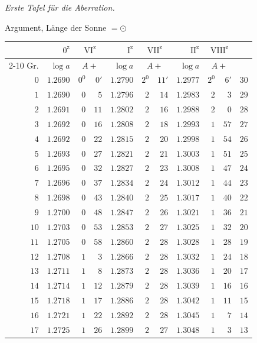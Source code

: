 \begin{center}
\textit{Erste Tafel für die Aberration.}\par\medskip
Argument, Länge der Sonne $=\odot$\par\medskip
\begingroup\small\setlength{\tabcolsep}{5pt}
\begin{tabular}{r||r|rr||r|rr||r|rr||r}
&$0^{\mathrm z}$&\multicolumn{2}{c||}{$\mathrm{VI}^{\mathrm z}$}&$\mathrm I^{\mathrm z}$&\multicolumn{2}{c||}{$\mathrm{VII}^{\mathrm z}$}&$\mathrm{II}^{\mathrm z}$&\multicolumn{2}{c||}{$\mathrm{VIII}^{\mathrm z}$}&\\\cline{2-10}
Gr.&$\log a$&\multicolumn{2}{c||}{$A+$}&$\log a$&\multicolumn{2}{c||}{$A+$}&$\log a$&\multicolumn{2}{c||}{$A+$}&\\\hline
$0$&$1.2690$&$0^0$&$0'$&$1.2790$&$2^0$&$11'$&$1.2977$&$2^0$&$6'$&$30$\\
$1$&$1.2690$&$0$&$5$&$1.2796$&$2$&$14$&$1.2983$&$2$&$3$&$29$\\
$2$&$1.2691$&$0$&$11$&$1.2802$&$2$&$16$&$1.2988$&$2$&$0$&$28$\\
$3$&$1.2692$&$0$&$16$&$1.2808$&$2$&$18$&$1.2993$&$1$&$57$&$27$\\
$4$&$1.2692$&$0$&$22$&$1.2815$&$2$&$20$&$1.2998$&$1$&$54$&$26$\\
$5$&$1.2693$&$0$&$27$&$1.2821$&$2$&$21$&$1.3003$&$1$&$51$&$25$\\[3pt]
$6$&$1.2695$&$0$&$32$&$1.2827$&$2$&$23$&$1.3008$&$1$&$47$&$24$\\
$7$&$1.2696$&$0$&$37$&$1.2834$&$2$&$24$&$1.3012$&$1$&$44$&$23$\\
$8$&$1.2698$&$0$&$43$&$1.2840$&$2$&$25$&$1.3017$&$1$&$40$&$22$\\
$9$&$1.2700$&$0$&$48$&$1.2847$&$2$&$26$&$1.3021$&$1$&$36$&$21$\\
$10$&$1.2703$&$0$&$53$&$1.2853$&$2$&$27$&$1.3025$&$1$&$32$&$20$\\[3pt]
$11$&$1.2705$&$0$&$58$&$1.2860$&$2$&$28$&$1.3028$&$1$&$28$&$19$\\
$12$&$1.2708$&$1$&$3$&$1.2866$&$2$&$28$&$1.3032$&$1$&$24$&$18$\\
$13$&$1.2711$&$1$&$8$&$1.2873$&$2$&$28$&$1.3036$&$1$&$20$&$17$\\
$14$&$1.2714$&$1$&$12$&$1.2879$&$2$&$28$&$1.3039$&$1$&$16$&$16$\\
$15$&$1.2718$&$1$&$17$&$1.2886$&$2$&$28$&$1.3042$&$1$&$11$&$15$\\[3pt]
$16$&$1.2721$&$1$&$22$&$1.2892$&$2$&$28$&$1.3045$&$1$&$7$&$14$\\
$17$&$1.2725$&$1$&$26$&$1.2899$&$2$&$27$&$1.3048$&$1$&$3$&$13$\\

\end{tabular}
\end{center}
